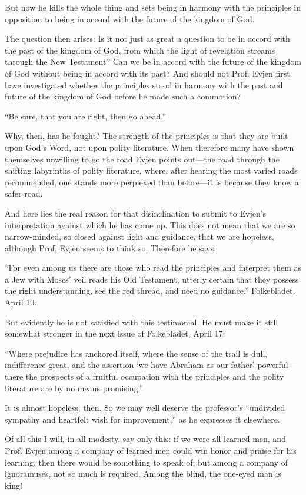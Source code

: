 But now he kills the whole thing and sets being in harmony with the principles in opposition to being in accord with the future of the kingdom of God.

The question then arises: Is it not just as great a question to be in accord with the past of the kingdom of God, from which the light of revelation streams through the New Testament? Can we be in accord with the future of the kingdom of God without being in accord with its past? And should not Prof. Evjen first have investigated whether the principles stood in harmony with the past and future of the kingdom of God before he made such a commotion?

“Be sure, that you are right, then go ahead.”

Why, then, has he fought? The strength of the principles is that they are built upon God’s Word, not upon polity literature. When therefore many have shown themselves unwilling to go the road Evjen points out—the road through the shifting labyrinths of polity literature, where, after hearing the most varied roads recommended, one stands more perplexed than before—it is because they know a safer road.

And here lies the real reason for that disinclination to submit to Evjen’s interpretation against which he has come up. This does not mean that we are so narrow-minded, so closed against light and guidance, that we are hopeless, although Prof. Evjen seems to think so. Therefore he says:

“For even among us there are those who read the principles and interpret them as a Jew with Moses’ veil reads his Old Testament, utterly certain that they possess the right understanding, see the red thread, and need no guidance.” Folkebladet, April 10.

But evidently he is not satisfied with this testimonial. He must make it still somewhat stronger in the next issue of Folkebladet, April 17:

“Where prejudice has anchored itself, where the sense of the trail is dull, indifference great, and the assertion ‘we have Abraham as our father’ powerful—there the prospects of a fruitful occupation with the principles and the polity literature are by no means promising.”

It is almost hopeless, then. So we may well deserve the professor’s “undivided sympathy and heartfelt wish for improvement,” as he expresses it elsewhere.

Of all this I will, in all modesty, say only this: if we were all learned men, and Prof. Evjen among a company of learned men could win honor and praise for his learning, then there would be something to speak of; but among a company of ignoramuses, not so much is required. Among the blind, the one-eyed man is king!

